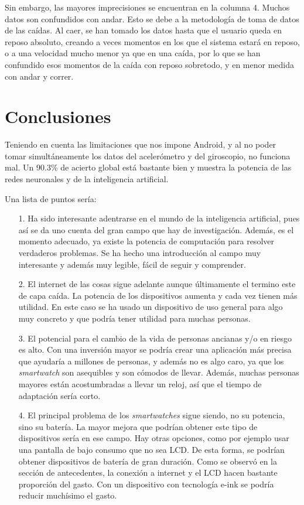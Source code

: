 \documentclass[12pt]{article}
\numberwithin{equation}{section}
\begin{document}
{Sin embargo, las mayores imprecisiones se encuentran en la columna 4. Muchos datos son confundidos con andar. Esto se debe a la metodología de toma de datos de las caídas. Al caer, se han tomado los datos hasta que el usuario queda en reposo absoluto, creando a veces momentos en los que el sistema estará en reposo, o a una velocidad mucho menor ya que en una caída, por lo que se han confundido esos momentos de la caída con reposo sobretodo, y en menor medida con andar y correr.


\newpage
\section{Conclusiones}

Teniendo en cuenta las limitaciones que nos impone Android, y al no poder tomar simultáneamente los datos del acelerómetro y del giroscopio, no funciona mal. Un 90.3\% de acierto global está bastante bien y muestra la potencia de las redes neuronales y de la inteligencia artificial.

Una lista de puntos sería:

\begin{enumerate}
\item[1.] Ha sido interesante adentrarse en el mundo de la inteligencia artificial, pues así se da uno cuenta del gran campo que hay de investigación. Además, es el momento adecuado, ya existe la potencia de computación para resolver verdaderos problemas. Se ha hecho una introducción al campo muy interesante y además muy legible, fácil de seguir y comprender.

\item[2.] El internet de las cosas sigue adelante aunque últimamente el termino este de capa caída. La potencia de los dispositivos aumenta y cada vez tienen más utilidad. En este caso se ha usado un dispositivo de uso general para algo muy concreto y que podría tener utilidad para muchas personas.

\item[3.] El potencial para el cambio de la vida de personas ancianas y/o en riesgo es alto. Con una inversión mayor se podría crear una aplicación más precisa que ayudaría a millones de personas, y además no es algo caro, ya que los \textit{smartwatch} son asequibles y son cómodos de llevar. Además, muchas personas mayores están acostumbradas a llevar un reloj, así que el tiempo de adaptación sería corto.

\item[4.] El principal problema de los \textit{smartwatches} sigue siendo, no su potencia, sino su batería. La mayor mejora que podrían obtener este tipo de dispositivos sería en ese campo. Hay otras opciones, como por ejemplo usar una pantalla de bajo consumo que no sea LCD. De esta forma, se podrían obtener dispositivos de batería de gran duración. Como se observó en la sección de antecedentes, la conexión a internet y el LCD hacen bastante proporción del gasto. Con un dispositivo con tecnología e-ink se podría reducir muchísimo el gasto.


\end{enumerate}}
\end{document}
